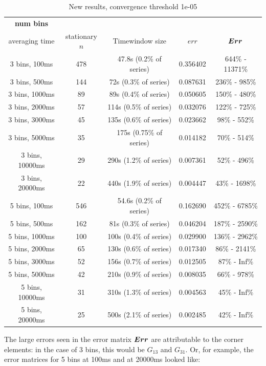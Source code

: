 \begin{table}[H]
\small
\centering
\caption{New results, convergence threshold 1e-05}
\vspace*{2.5mm}
\begin{tabular}{c|c|c|c|c}
\hline
\bf num bins & & & & \\ averaging time & stationary $n$ & Timewindow size & $err$ & $\boldsymbol{Err}$ \\
\hline\hline
3 bins, 100ms & 478 & 47.8s (0.2\% of series) & 0.356402 & 644\% - 11371\% \\
\hline
3 bins, 500ms & 144 & 72s (0.3\% of series) & 0.087631 & 236\% - 985\% \\
\hline
3 bins, 1000ms & 89 & 89s (0.4\% of series) &  0.050605 & 150\% - 480\% \\
\hline
3 bins, 2000ms & 57 & 114s (0.5\% of series) & 0.032076 & 122\% - 725\% \\
\hline
3 bins, 3000ms & 45 & 135s (0.6\% of series) & 0.023662 & 98\% - 552\% \\
\hline
3 bins, 5000ms & 35 & 175s (0.75\% of series) & 0.014182 & 70\% - 514\% \\
\hline
3 bins, 10000ms & 29 & 290s (1.2\% of series) & 0.007361 & 52\% - 496\% \\
\hline
3 bins, 20000ms & 22 & 440s (1.9\% of series) & 0.004447 & 43\% - 1698\% \\
\hline
\hline
5 bins, 100ms & 546 & 54.6s (0.2\% of series) & 0.162690 & 452\% - 6785\% \\
\hline
5 bins, 500ms & 162 & 81s (0.3\% of series) &  0.046204 & 187\% - 2590\% \\
\hline
5 bins, 1000ms & 100 & 100s (0.4\% of series) & 0.029900 & 136\% - 2962\% \\
\hline
5 bins, 2000ms & 65 & 130s (0.6\% of series)  & 0.017340 & 86\% - 2141\% \\
\hline
5 bins, 3000ms & 52 & 156s (0.7\% of series) &  0.012505 & 87\% - Inf\% \\
\hline
5 bins, 5000ms & 42 & 210s (0.9\% of series) & 0.008035 & 66\% - 978\% \\
\hline
5 bins, 10000ms & 31 & 310s (1.3\% of series) & 0.004563 & 45\% - Inf\% \\
\hline
5 bins, 20000ms & 25 & 500s (2.1\% of series) & 0.002485 & 42\% - Inf\% \\
\hline
\end{tabular}
\end{table}

The large errors seen in the error matrix $\boldsymbol{Err}$ are attributable to the corner elements: in the case of 3 bins, this would be $G_{13}$ and $G_{31}$. Or, for example, the error matrices for 5 bins at 100ms and at 20000ms looked like:

